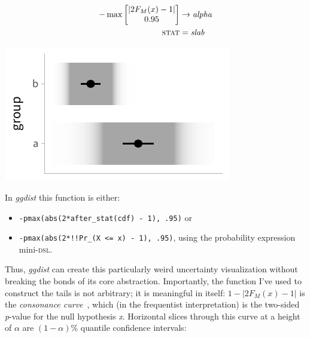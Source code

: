 \documentclass[journal]{vgtc}                     %
\begin{document}
\noindent
\begin{minipage}{.5\columnwidth}

\begin{align*}
-\max \left[ \begin{matrix} \lvert 2 F_M(x) - 1 \rvert \\ 0.95 \end{matrix} \right] &\rightarrow \textit{alpha}\\
\textsc{stat} &= \mathit{slab}
\end{align*}
\end{minipage}%
  \begin{minipage}{.4\columnwidth}
    \centering
    \includegraphics[width=1.2\columnwidth]{figs/3-slab_gradient_correll.pdf}
  \end{minipage}
\hfill\break

In \textit{ggdist} this function is either:
\begin{itemize}
    \item \texttt{-pmax(abs(2*after\_stat(cdf) - 1), .95)} or
    \item    \texttt{-pmax(abs(2*!!Pr\_(X <= x) - 1), .95)}, using the probability expression mini-\textsc{dsl}.
\end{itemize}

Thus, \textit{ggdist} can create this particularly weird uncertainty visualization without breaking the bonds of its core abstraction. Importantly, the function I've used to construct the tails is not arbitrary; it is meaningful in itself: $1 - \lvert 2 F_M(x) - 1 \rvert$ is the \textit{consonance curve}~\cite{amrhein2022discuss}, which (in the frequentist interpretation) is the two-sided \textit{p}-value for the null hypothesis \textit{x}. Horizontal slices through this curve at a height of $\alpha$ are $(1 - \alpha)\%$ quantile confidence intervals:
\end{document}
